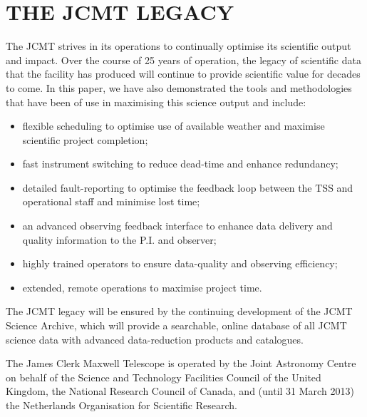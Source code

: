 \documentclass[]{spie}  %
\begin{document}
\section{THE JCMT LEGACY}

The JCMT strives in its operations to continually optimise its
scientific output and impact. Over the course of 25 years of
operation, the legacy of scientific data that the facility has
produced will continue to provide scientific value for decades to
come. In this paper, we have also demonstrated the tools and
methodologies that have been of use in maximising this science output
and include:
\begin{itemize}
\item flexible scheduling to optimise use of available weather and
  maximise scientific project completion;
\item fast instrument switching to reduce dead-time and enhance
  redundancy;
\item detailed fault-reporting to optimise the feedback loop between
  the TSS and operational staff and minimise lost time;
\item an advanced observing feedback interface to enhance data
  delivery and quality information to the P.I. and observer;
\item highly trained operators to ensure data-quality and observing
  efficiency;
\item extended, remote operations to maximise project time.
\end{itemize}

The JCMT legacy will be ensured by the continuing development of the
JCMT Science Archive,\cite{jsahistory} which will provide a searchable,
online database of all JCMT science data with advanced data-reduction
products and catalogues.\cite{2014SPIE9152-93}

\acknowledgments     %

The James Clerk Maxwell Telescope is operated by the Joint Astronomy
Centre on behalf of the Science and Technology Facilities Council of
the United Kingdom, the National Research Council of Canada, and
(until 31 March 2013) the Netherlands Organisation for Scientific
Research.



\end{document}
